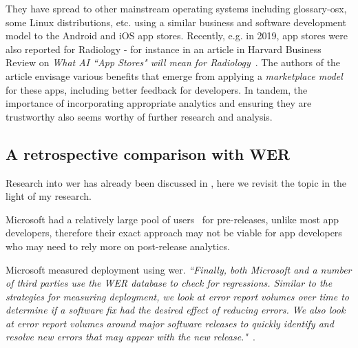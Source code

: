 
They have spread to other mainstream operating systems including \Gls{glossary-osx}, some Linux distributions, etc. using a similar business and software development model to the Android and iOS app stores. Recently, e.g. in 2019, app stores were also reported for Radiology - for instance in an article in Harvard Business Review on \emph{What AI ``App Stores" will mean for Radiology}~\cite{hbr_what_ai_app_stores_mean_for_radiology}. The authors of the article envisage various benefits that emerge from applying a \emph{marketplace model} for these apps, including better feedback for developers. In tandem, the importance of incorporating appropriate analytics and ensuring they are trustworthy also seems worthy of further research and analysis. 

\subsection{A retrospective comparison with WER}
Research into \acrfull{wer} has already been discussed in , here we revisit the topic in the light of my research.



Microsoft had a relatively large pool of users~ for pre-releases, unlike most app developers, therefore their exact approach may not be viable for app developers who may need to rely more on post-release analytics.


Microsoft measured deployment using \Gls{wer}. 
\emph{``Finally, both Microsoft and a number of third parties use the WER database to check for regressions. Similar to the strategies for measuring deployment, we look at error report volumes over time to determine if a software fix had the desired effect of reducing errors. We also look at error report volumes around major software releases to quickly identify and resolve new errors that may appear with the new release."}~.


